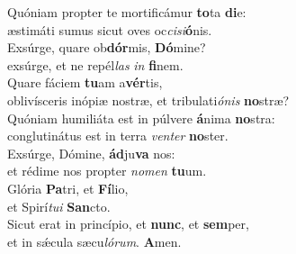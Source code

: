 \evenverse Quóniam propter te mortificámur \textbf{to}ta \textbf{di}e:~\*\\
\evenverse æstimáti sumus sicut oves oc\textit{ci}\textit{si}\textbf{ó}nis.\\
\oddverse Exsúrge, quare ob\textbf{dór}mis, \textbf{Dó}mine?~\*\\
\oddverse exsúrge, et ne repél\textit{las} \textit{in} \textbf{fi}nem.\\
\evenverse Quare fáciem \textbf{tu}am a\textbf{vér}tis,~\*\\
\evenverse oblivísceris inópiæ nostræ, et tribulati\textit{ó}\textit{nis} \textbf{no}stræ?\\
\oddverse Quóniam humiliáta est in púlvere \textbf{á}nima \textbf{no}stra:~\*\\
\oddverse conglutinátus est in terra \textit{ven}\textit{ter} \textbf{no}ster.\\
\evenverse Exsúrge, Dómine, \textbf{ád}ju\textbf{va} nos:~\*\\
\evenverse et rédime nos propter \textit{no}\textit{men} \textbf{tu}um.\\
\oddverse Glória \textbf{Pa}tri, et \textbf{Fí}lio,~\*\\
\oddverse et Spirí\textit{tu}\textit{i} \textbf{San}cto.\\
\evenverse Sicut erat in princípio, et \textbf{nunc}, et \textbf{sem}per,~\*\\
\evenverse et in sǽcula sæcu\textit{ló}\textit{rum}. \textbf{A}men.\\
